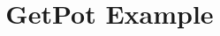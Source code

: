 \documentclass[smaller,a4paper]{beamer}
\begin{document}
\title{GetPot Example}
\frame{\titlepage}
\end{document}
